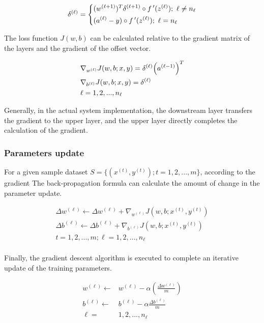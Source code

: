 \begin{content}
\begin{content}
\[{\delta ^{(\ell)}} = \left\{ \begin{gathered}
  {({w^{(\ell + 1)}})^T}{\delta ^{(\ell + 1)}} \circ f\,'({z^{(\ell)}});{\text{  }}\ell \ne {n_\ell} \hfill \\
  ({a^{(\ell)}} - y) \circ f\,'({z^{(\ell)}}); {\text{  }}\ell = {n_\ell} \hfill \\ 
\end{gathered}  \right.\]

The loss function $J(w,b)$ can be calculated relative to the gradient matrix of the layers and the gradient of the offset vector.

\[\begin{gathered}
  {\nabla _{{w^{(\ell )}}}}J(w,b;x,y) = {\delta ^{(\ell )}}{\left( {{a^{(\ell  - 1)}}} \right)^T} \hfill \\
  {\nabla _{{b^{(\ell )}}}}J(w,b;x,y) = {\delta ^{(\ell )}} \hfill \\
  \ell  = 1,2,...,{n_\ell } \hfill \\ 
\end{gathered} \]

Generally, in the actual system implementation, the downstream layer transfers the gradient to the upper layer, and the upper layer directly completes the calculation of the gradient.


\subsubsection{Parameters update}
For a given sample dataset $ S = \{ ({x^{(t)}}, {y^{(t)}});t = 1,2,...,m\} $, according to the gradient The back-propagation formula can calculate the amount of change in the parameter update.

\[\begin{aligned}
  \Delta {w^{(\ell )}} \leftarrow \Delta {w^{(\ell )}} + {\nabla _{{w^{(\ell )}}}}J\left( {w,b;{x^{(t)}},{y^{(t)}}} \right) \\ 
  \Delta {b^{(\ell )}} \leftarrow \Delta {b^{(\ell )}} + {\nabla _{{b^{(\ell )}}}}J\left( {w,b;{x^{(t)}},{y^{(t)}}} \right) \\ 
  t = 1,2,...,m;\ell  = 1,2,...,{n_\ell } \\ 
\end{aligned} \]

Finally, the gradient descent algorithm is executed to complete an iterative update of the training parameters.

\[\begin{aligned}
  {w^{(\ell )}} \leftarrow  & {w^{(\ell )}} - \alpha \left( {\frac{{\Delta {w^{(\ell )}}}}{m}} \right) \\ 
  {b^{(\ell )}} \leftarrow  & {b^{(\ell )}} - \alpha \frac{{\Delta {b^{(\ell )}}}}{m} \\ 
  \ell  = & 1,2,...,{n_\ell }  \\
\end{aligned} \]



\end{content}
\end{content}
